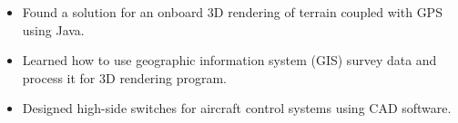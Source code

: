 \accomplishments
\begin{itemize}[leftmargin=*]
\item Found a solution for an onboard 3D rendering of terrain coupled with GPS %
      using Java.
\item Learned how to use geographic information system (GIS) survey data and %
      process it for 3D rendering program.
\item Designed high-side switches for aircraft control systems using CAD software.
\end{itemize}